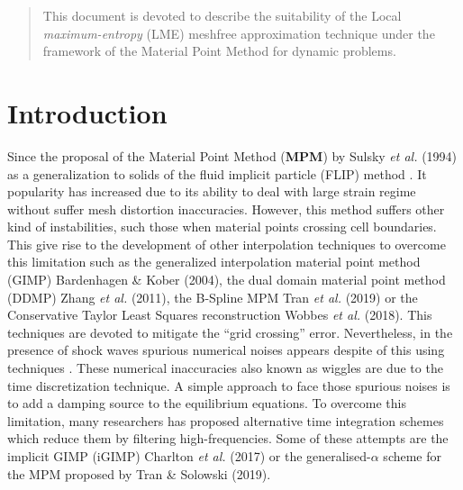 \date{Received: date / Accepted: date}

\maketitle
\begin{abstract}
  This document is devoted to describe the suitability of the Local
  \textit{maximum-entropy} (LME) meshfree approximation technique under the framework of the
  Material Point Method for dynamic problems. 
\end{abstract}

\section{Introduction}
\label{intro}
Since the proposal of the Material Point Method (\textbf{MPM}) by
Sulsky {\it  et al.} (1994)\cite{Sulsky1994} as a generalization to
solids of the fluid implicit particle (FLIP) method
\cite{Brackbill1986}. It popularity has increased due to its ability
to deal with large strain regime without suffer mesh distortion
inaccuracies. However, this method suffers other kind of
instabilities, such those when material points crossing cell
boundaries. This give rise to the development of other interpolation
techniques to overcome this limitation such as the generalized
interpolation material point method (GIMP) Bardenhagen \& Kober
(2004)\cite{Bardenhagen2004}, the dual
domain material point method (DDMP) Zhang {\it et al.}
(2011)\cite{Zhang2011a}, the B-Spline MPM Tran {\it et al.}
(2019)\cite{Tran2019a} or the Conservative Taylor
Least Squares reconstruction Wobbes {\it et al.}
(2018)\cite{E_Wobbes_2018}. This techniques are devoted to mitigate the
``grid crossing'' error.
Nevertheless, in the presence of shock waves spurious
numerical noises appears despite of this using techniques \cite{Tran2019e}. These numerical
inaccuracies also known as wiggles are due to the time discretization
technique. A simple approach to face those spurious noises is to add a
damping source to the equilibrium equations. To overcome this
limitation, many researchers has proposed alternative time integration
schemes which reduce them by filtering high-frequencies. Some of these
attempts are the implicit GIMP (iGIMP) Charlton {\it et al.}
(2017)\nocite{Charlton2017} or the generalised-$\alpha$ scheme for the
MPM proposed by Tran \& Solowski (2019)\nocite{Tran2019e}.

